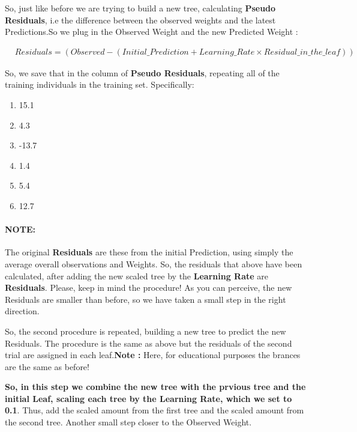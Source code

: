 \documentclass[12pt, a4paper]{article} %
\begin{document}
\newline

So, just like before we are trying to build a new tree, calculating \textbf{Pseudo Residuals}, i.e the difference between the observed weights and the latest Predictions.So we plug in the Observed Weight and the new Predicted Weight : 

\begin{align*}
    & Residuals = (Observed -   (Initial\_Prediction + Learning\_Rate \times  Residual\_in\_the\_ leaf)) 
\end{align*}

So, we save that in the column of \textbf{Pseudo Residuals}, repeating all of the training individuals in the training set. Specifically:

\begin{enumerate}
    \item 15.1
    \item 4.3
    \item -13.7
    \item 1.4
    \item 5.4
    \item 12.7
\end{enumerate}

\paragraph{NOTE:} The original \textbf{Residuals} are these from the initial Prediction, using simply the average overall observations and Weights. So, the residuals that above have been calculated, after adding the new scaled tree by the \textbf{Learning Rate} are \textbf{Residuals}. Please, keep in mind the procedure! As you can perceive, the new Residuals are smaller than before, so we have taken a small step in the right direction.

\newline

So, the second procedure is repeated, building a new tree to predict the new Residuals. The procedure is the same as above but the residuals of the second trial are assigned in each leaf.\textbf{Note :} Here, for educational purposes the brances are the same as before!

\textbf{So, in this step we combine the new tree with the prvious tree and the initial Leaf, scaling each tree by the Learning Rate, which we set to 0.1}. Thus, add the scaled amount from the first tree and the scaled amount from the second tree. Another small step closer to the Observed Weight.
\end{document}

